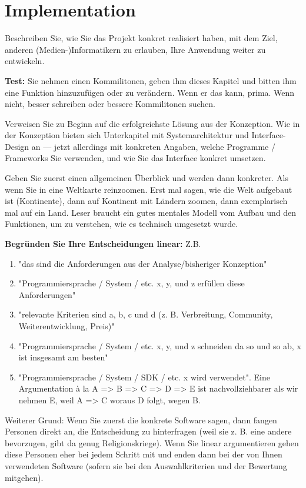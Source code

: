 \documentclass[11pt,a4paper,english]{scrreprt}
\newenvironment{comment}
  {\par\medskip
   \begingroup\color{olive}%
   }
 {\endgroup
  \medskip}
\begin{document}
\chapter{Implementation}\label{chapter:implementation}
\begin{comment}
Beschreiben Sie, wie Sie das Projekt konkret realisiert haben, mit dem Ziel, anderen (Medien-)Informatikern zu erlauben, Ihre Anwendung weiter zu entwickeln.

\textbf{Test:} Sie nehmen einen Kommilitonen, geben ihm dieses Kapitel und bitten ihm eine Funktion hinzuzufügen oder zu verändern. Wenn er das kann, prima. Wenn nicht, besser schreiben oder bessere Kommilitonen suchen.

Verweisen Sie zu Beginn auf die erfolgreichste Lösung aus der Konzeption. Wie in der Konzeption bieten sich Unterkapitel mit Systemarchitektur und Interface-Design an — jetzt allerdings mit konkreten Angaben, welche Programme / Frameworks Sie verwenden, und wie Sie das Interface konkret umsetzen.

Geben Sie zuerst einen allgemeinen Überblick und werden dann konkreter. Als wenn Sie in eine Weltkarte reinzoomen. Erst mal sagen, wie die Welt aufgebaut ist (Kontinente), dann auf Kontinent mit Ländern zoomen, dann exemplarisch mal auf ein Land. Leser braucht ein gutes mentales Modell vom Aufbau und den Funktionen, um zu verstehen, wie es technisch umgesetzt wurde.

\textbf{Begründen Sie Ihre Entscheidungen linear:} Z.B.

\begin{enumerate}
    \item "das sind die Anforderungen aus der Analyse/bisheriger Konzeption"
    \item "Programmiersprache / System / etc. x, y, und z erfüllen diese Anforderungen"
    \item "relevante Kriterien sind a, b, c und d (z. B. Verbreitung, Community, Weiterentwicklung, Preis)"
    \item "Programmiersprache / System / etc. x, y, und z schneiden da so und so ab, x ist insgesamt am besten"
    \item "Programmiersprache / System / SDK / etc. x wird verwendet". Eine Argumentation à la A => B => C => D => E ist nachvollziehbarer als wir nehmen E, weil A => C woraus D folgt, wegen B.
\end{enumerate}

Weiterer Grund: Wenn Sie zuerst die konkrete Software sagen, dann fangen Personen direkt an, die Entscheidung zu hinterfragen (weil sie z. B. eine andere bevorzugen, gibt da genug Religionskriege). Wenn Sie linear argumentieren gehen diese Personen eher bei jedem Schritt mit und enden dann bei der von Ihnen verwendeten Software (sofern sie bei den Auswahlkriterien und der Bewertung mitgehen).


\end{comment}
\end{document}
